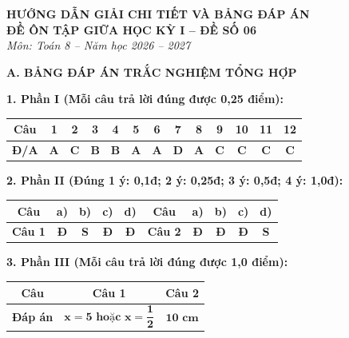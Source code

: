 \documentclass[12pt,a4paper]{article}
\begin{document}
\begin{center}
  \textbf{\Large HƯỚNG DẪN GIẢI CHI TIẾT VÀ BẢNG ĐÁP ÁN}\\
  \textbf{\large ĐỀ ÔN TẬP GIỮA HỌC KỲ I -- ĐỀ SỐ 06}\\
  \textit{Môn: Toán 8 -- Năm học 2026 -- 2027}
\end{center}
\vspace{2mm}

\noindent\textbf{\large A. BẢNG ĐÁP ÁN TRẮC NGHIỆM TỔNG HỢP}
\vspace{1mm}

\noindent\textbf{1. Phần I (Mỗi câu trả lời đúng được 0,25 điểm):}
\begin{center}
\begin{tabular}{|c|c|c|c|c|c|c|c|c|c|c|c|c|}
\hline
\textbf{Câu} & \textbf{1} & \textbf{2} & \textbf{3} & \textbf{4} & \textbf{5} & \textbf{6} & \textbf{7} & \textbf{8} & \textbf{9} & \textbf{10} & \textbf{11} & \textbf{12} \\
\hline
\textbf{Đ/A} & \textbf{A} & \textbf{C} & \textbf{B} & \textbf{B} & \textbf{A} & \textbf{A} & \textbf{D} & \textbf{A} & \textbf{C} & \textbf{C} & \textbf{C} & \textbf{C} \\
\hline
\end{tabular}
\end{center}
\vspace{0.5mm}

\noindent\textbf{2. Phần II (Đúng 1 ý: 0,1đ; 2 ý: 0,25đ; 3 ý: 0,5đ; 4 ý: 1,0đ):}
\begin{center}
\begin{tabular}{|c|c|c|c|c||c|c|c|c|c|}
\hline
\textbf{Câu} & \textbf{a)} & \textbf{b)} & \textbf{c)} & \textbf{d)} & \textbf{Câu} & \textbf{a)} & \textbf{b)} & \textbf{c)} & \textbf{d)} \\
\hline
\textbf{Câu 1} & \textbf{Đ} & \textbf{S} & \textbf{Đ} & \textbf{Đ} & \textbf{Câu 2} & \textbf{Đ} & \textbf{Đ} & \textbf{Đ} & \textbf{S} \\
\hline
\end{tabular}
\end{center}
\vspace{0.5mm}

\noindent\textbf{3. Phần III (Mỗi câu trả lời đúng được 1,0 điểm):}
\begin{center}
\begin{tabular}{|c|c|c|}
\hline
\textbf{Câu} & \textbf{Câu 1} & \textbf{Câu 2} \\
\hline
\textbf{Đáp án} & $\mathbf{x = 5 \text{ hoặc } x = \dfrac{1}{2}}$ & $\mathbf{10\text{ cm}}$ \\
\hline
\end{tabular}
\end{center}
\vspace{1.5mm}
\end{document}
